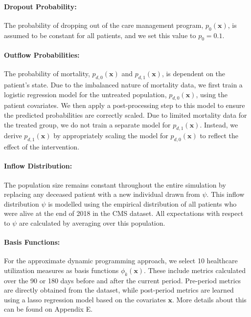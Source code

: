 \documentclass[12pt,a4paper]{article}
\begin{document}
\paragraph{\bf Dropout Probability:} The probability of dropping out of the care management program, $p_0(\mathbf{x})$, is assumed to be constant for all patients, and we set this value to $p_0 = 0.1$.


\paragraph{\bf Outflow Probabilities:}
The probability of mortality, $p_{d,0}(\mathbf{x})$ and $p_{d,1}(\mathbf{x})$, is dependent on the patient's state. Due to the imbalanced nature of mortality data, we first train a logistic regression model for the untreated population, $p_{d,0}(\mathbf{x})$, using the patient covariates. We then apply a post-processing step to this model to ensure the predicted probabilities are correctly scaled. Due to limited mortality data for the treated group, we do not train a separate model for $p_{d,1}(\mathbf{x})$. Instead, we derive $p_{d,1}(\mathbf{x})$ by appropriately scaling the model for $p_{d,0}(\mathbf{x})$ to reflect the effect of the intervention.



\paragraph{\bf Inflow Distribution:}
  The population size remains constant throughout the entire simulation by replacing any deceased patient with a new individual drawn from \( \psi \). This inflow distribution $\psi$ is modelled using the empirical distribution of all patients who were alive at the end of 2018 in the CMS dataset. All expectations with respect to $\psi$ are calculated by averaging over this population.

\paragraph{\bf Basis Functions:}
For the approximate dynamic programming approach, we select 10 healthcare utilization measures as basis functions $\phi_k(\mathbf{x})$. These include metrics calculated over the 90 or 180 days before and after the current period. Pre-period metrics are directly obtained from the dataset, while post-period metrics are learned using a lasso regression model based on the covariates $\mathbf{x}$. More details about this can be found on Appendix E.
\end{document}

